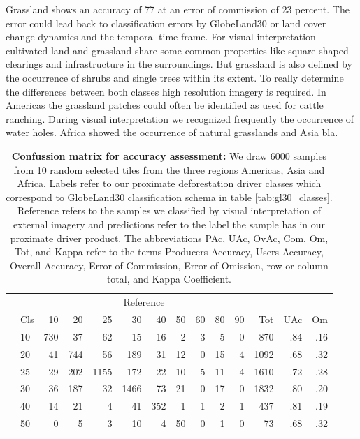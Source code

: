 			Grassland shows an accuracy of 77 at an error of commission of 23 percent. The error could lead back to classification errors by GlobeLand30 or land cover change dynamics and the temporal time frame. For visual interpretation cultivated land and grassland share some common properties like square shaped clearings and infrastructure in the surroundings. But grassland is also defined by the occurrence of shrubs and single trees within its extent. To really determine the differences between both classes high resolution imagery is required. In Americas the grassland patches could often be identified as used for cattle ranching. During visual interpretation we recognized frequently the occurrence of water holes. Africa showed the occurrence of natural grasslands and Asia bla.
			\begin{table}[ht]
				\centering
				\caption[Confussion matrix]{\textbf{Confussion matrix for accuracy assessment:} We draw 6000 samples from 10 random selected tiles from the three regions Americas, Asia and Africa. Labels refer to our proximate deforestation driver classes which correspond to GlobeLand30 classification schema in table \ref{tab:gl30_classes}. Reference refers to the samples we classified by visual interpretation of external imagery and predictions refer to the label the sample has in our proximate driver product. The abbreviations PAc, UAc, OvAc, Com, Om, Tot, and Kappa refer to the terms Producers-Accuracy, Users-Accuracy, Overall-Accuracy, Error of Commission, Error of Omission, row or column total, and Kappa Coefficient.}
				\label{tab:results_confusion_matrix}
				\begin{tabular}{llrrrrrrrrrrrr}
					\hline
					& & \multicolumn{9}{c}{Reference} & & & \\\cline{3-11}
					& Cls & 10 & 20 & 25 & 30 & 40 & 50 & 60 & 80 & 90 & Tot & UAc & Om \\\hline
					\multirow{9}{*}{\STAB{\rotatebox[origin=c]{90}{Prediction}}}
					& 10 & 730 & 37 & 62 & 15 & 16 & 2 & 3 & 5 & 0 & 870 & .84 & .16 \\ 
					& 20 & 41 & 744 & 56 & 189 & 31 & 12 & 0 & 15 & 4 & 1092 & .68 & .32 \\ 
					& 25 & 29 & 202 & 1155 & 172 & 22 & 10 & 5 & 11 & 4 & 1610 & .72 & .28 \\ 
					& 30 & 36 & 187 & 32 & 1466 & 73 & 21 & 0 & 17 & 0 & 1832 & .80 & .20 \\ 
					& 40 & 14 & 21 & 4 & 41 & 352 & 1 & 1 & 2 & 1 & 437 & .81 & .19 \\ 
					& 50 & 0 & 5 & 3 & 10 & 4 & 50 & 0 & 1 & 0 & 73 & .68 & .32 \\ 

\end{tabular}
\end{table}
